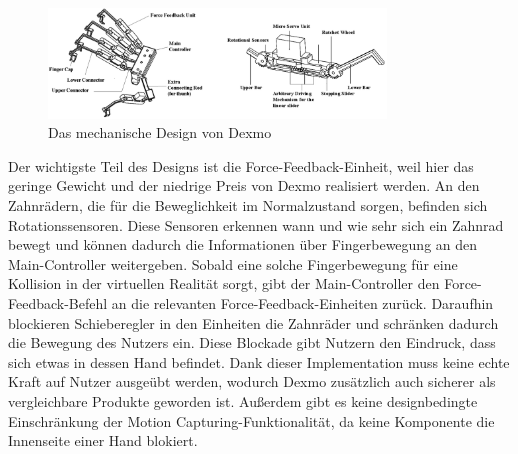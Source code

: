 \begin{figure}[!ht] %
\centering
\includegraphics[width=0.8\textwidth]{images/dexmo-structure.png}
\caption{Das mechanische Design von Dexmo}
\end{figure}

Der wichtigste Teil des Designs ist die Force-Feedback-Einheit, weil hier das geringe Gewicht und der niedrige Preis von Dexmo realisiert werden. An den Zahnrädern, die für die Beweglichkeit im Normalzustand sorgen, befinden sich Rotationssensoren. Diese Sensoren erkennen wann und wie sehr sich ein Zahnrad bewegt und können dadurch die Informationen über Fingerbewegung an den Main-Controller weitergeben. Sobald eine solche Fingerbewegung für eine Kollision in der virtuellen Realität sorgt, gibt der Main-Controller den Force-Feedback-Befehl an die relevanten Force-Feedback-Einheiten zurück. Daraufhin blockieren Schieberegler in den Einheiten die Zahnräder und schränken dadurch die Bewegung des Nutzers ein. Diese Blockade gibt Nutzern den Eindruck, dass sich etwas in dessen Hand befindet. Dank dieser Implementation muss keine echte Kraft auf Nutzer ausgeübt werden, wodurch Dexmo zusätzlich auch sicherer als vergleichbare Produkte geworden ist. Außerdem gibt es keine designbedingte Einschränkung der Motion Capturing-Funktionalität, da keine Komponente die Innenseite einer Hand blokiert. 

